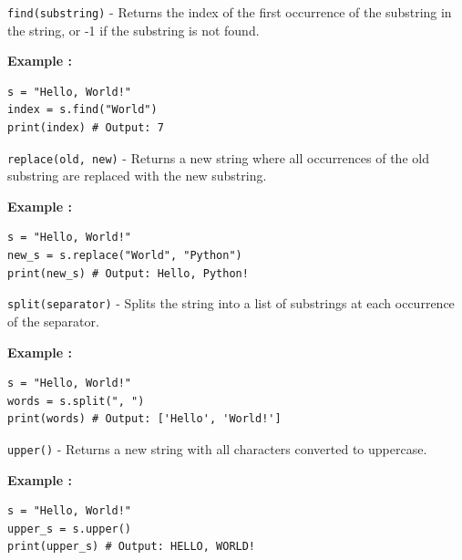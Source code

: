\documentclass[12pt]{book}
\newtheorem{Example}{Example}[chapter]
\renewenvironment{Example}{\begin{trivlist}\item\relax
\textbf{Example \thesection: }}{\end{trivlist}}
\begin{document}
\begin{itemize}
\item \texttt{find(substring)} - Returns the index of the first occurrence of the substring in the string, or -1 if the substring is not found.
\begin{Example}
\begin{lstlisting}
s = "Hello, World!"
index = s.find("World")
print(index) # Output: 7
\end{lstlisting}
\end{Example}

\item \texttt{replace(old, new)} - Returns a new string where all occurrences of the old substring are replaced with the new substring.
\begin{Example}
\begin{lstlisting}
s = "Hello, World!"
new_s = s.replace("World", "Python")
print(new_s) # Output: Hello, Python!
\end{lstlisting}
\end{Example}

\item \texttt{split(separator)} - Splits the string into a list of substrings at each occurrence of the separator.
\begin{Example}
\begin{lstlisting}
s = "Hello, World!"
words = s.split(", ")
print(words) # Output: ['Hello', 'World!']
\end{lstlisting}
\end{Example}

\item \texttt{upper()} - Returns a new string with all characters converted to uppercase.
\begin{Example}
\begin{lstlisting}
s = "Hello, World!"
upper_s = s.upper()
print(upper_s) # Output: HELLO, WORLD!
\end{lstlisting}
\end{Example}
\end{itemize}
\end{document}
